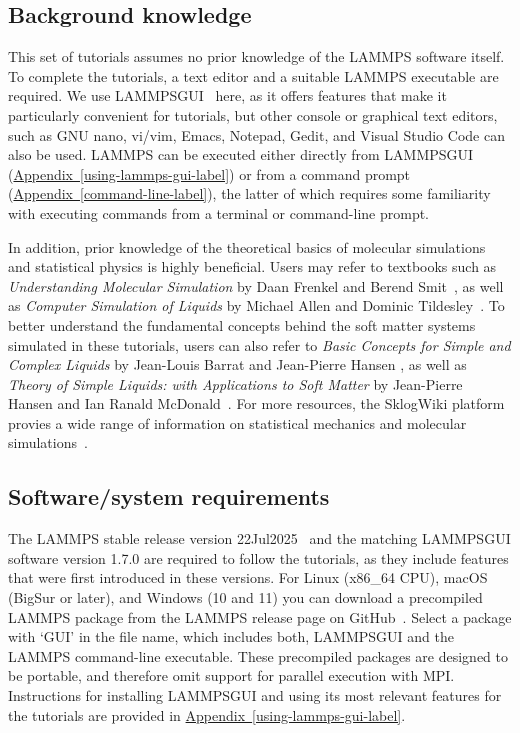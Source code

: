 \documentclass[9pt,tutorial]{livecoms}
\newcommand{\lammpsgui}{\textsf{LAMMPS\textendash GUI}}
\begin{document}
\subsection{Background knowledge}

This set of tutorials assumes no prior knowledge of the LAMMPS software
itself.  To complete the tutorials, a text editor and a suitable LAMMPS
executable are required.  We use \lammpsgui{}~\cite{lammps_gui_docs}
here, as it offers features that make it particularly convenient for
tutorials, but other console or graphical text editors, such as GNU
nano, vi/vim, Emacs, Notepad, Gedit, and Visual Studio Code can also be
used.  LAMMPS can be executed either directly from \lammpsgui{}
(\hyperref[using-lammps-gui-label]{Appendix~\ref{using-lammps-gui-label}})
or from a command prompt
(\hyperref[command-line-label]{Appendix~\ref{command-line-label}}), the
latter of which requires some familiarity with executing commands from a
terminal or command-line prompt.

In addition, prior knowledge of the theoretical basics of molecular
simulations and statistical physics is highly beneficial.  Users may
refer to textbooks such as \textit{Understanding Molecular Simulation} by
Daan Frenkel and Berend Smit~\cite{frenkel2023understanding}, as well as
\textit{Computer Simulation of Liquids} by Michael Allen and Dominic
Tildesley~\cite{allen2017computer}.  To better understand
the fundamental concepts behind the soft matter systems simulated in these
tutorials, users can also refer to \textit{Basic Concepts for Simple and
  Complex Liquids} by Jean-Louis Barrat and Jean-Pierre Hansen
\cite{barrat2003basic}, as well as \textit{Theory of Simple Liquids:
  with Applications to Soft Matter} by Jean-Pierre Hansen and Ian Ranald
McDonald~\cite{hansen2013theory}.  For more resources, the SklogWiki
platform provies a wide range of information on statistical mechanics
and molecular simulations~\cite{sklogwiki_main_page}.

\subsection{Software/system requirements}

The LAMMPS stable release {\color{blue}version 22Jul2025}~\cite{lammps_code}
and the matching \lammpsgui{} software {\color{blue}version 1.7.0} are required to
follow the tutorials, as they include features that were first
introduced in these versions.  For Linux (x86\_64 CPU), macOS (BigSur or
later), and Windows (10 and 11) you can download a precompiled LAMMPS
package from the LAMMPS release page on
GitHub~\cite{lammps_github_release}.  Select a package with `GUI' in the
file name, which includes both, \lammpsgui{} and the LAMMPS command-line
executable.  These precompiled packages are designed to be portable, and
therefore omit support for parallel execution with MPI.  Instructions
for installing \lammpsgui{} and using its most relevant features for the
tutorials are provided in
\hyperref[using-lammps-gui-label]{Appendix~\ref{using-lammps-gui-label}}.
\end{document}

